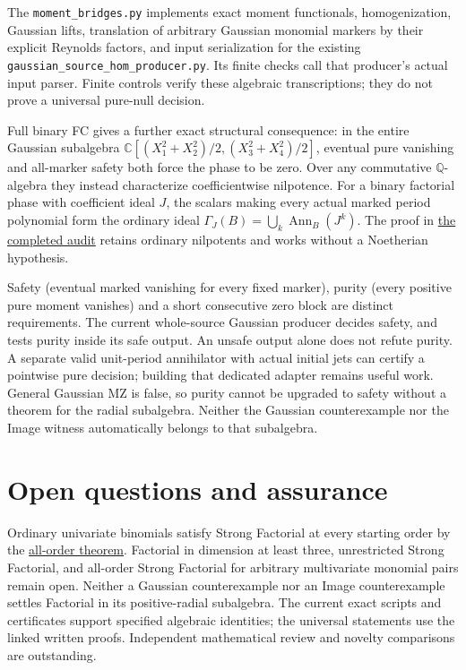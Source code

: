 \documentclass[11pt]{article}
\newcommand{\C}{\mathbb C}
\newcommand{\Q}{\mathbb Q}
\begin{document}
The \texttt{moment\_bridges.py} implements exact moment functionals,
homogenization, Gaussian lifts, translation of arbitrary Gaussian monomial
markers by their explicit Reynolds factors, and input serialization for
the existing \texttt{gaussian\_source\_hom\_producer.py}. Its finite checks
call that producer's actual input parser. Finite controls verify these algebraic transcriptions; they do not prove a universal pure-null decision.

Full binary FC gives a further exact structural consequence: in the entire
Gaussian subalgebra
$\C[(X_1^2+X_2^2)/2,(X_3^2+X_4^2)/2]$, eventual pure vanishing and
all-marker safety both force the phase to be zero. Over any commutative
$\Q$-algebra they instead characterize coefficientwise nilpotence.
For a binary factorial phase with coefficient ideal $J$, the scalars
making every actual marked period polynomial form the ordinary ideal
$\Gamma_J(B)=\bigcup_k\operatorname{Ann}_B(J^k)$.
The proof in \href{LONG_EIT_AND_FC2_AUDIT.tex}{the completed audit} retains
ordinary nilpotents and works without a Noetherian hypothesis.

Safety (eventual marked vanishing for every fixed marker), purity
(every positive pure moment vanishes) and a short consecutive zero block
are distinct requirements. The current whole-source Gaussian producer
decides safety, and tests purity inside its safe output. An unsafe output
alone does not refute purity. A separate valid unit-period annihilator
with actual initial jets can certify a pointwise pure decision; building
that dedicated adapter remains useful work. General Gaussian MZ is false,
so purity cannot be upgraded to safety without a theorem for the radial
subalgebra. Neither the Gaussian counterexample nor the Image witness
automatically belongs to that subalgebra.


\section*{Open questions and assurance}
Ordinary univariate binomials satisfy Strong Factorial at every starting
order by the \href{ORDINARY_BINOMIAL_RESIDUAL_REGION.md}{all-order theorem}.
Factorial in dimension at least three, unrestricted Strong Factorial,
and all-order Strong Factorial for arbitrary multivariate monomial pairs
remain open. Neither a Gaussian counterexample nor an Image
counterexample settles Factorial in its positive-radial subalgebra.
The current exact scripts and certificates support specified algebraic
identities; the universal statements use the linked written proofs.
Independent mathematical review and novelty comparisons are outstanding.
\end{document}
